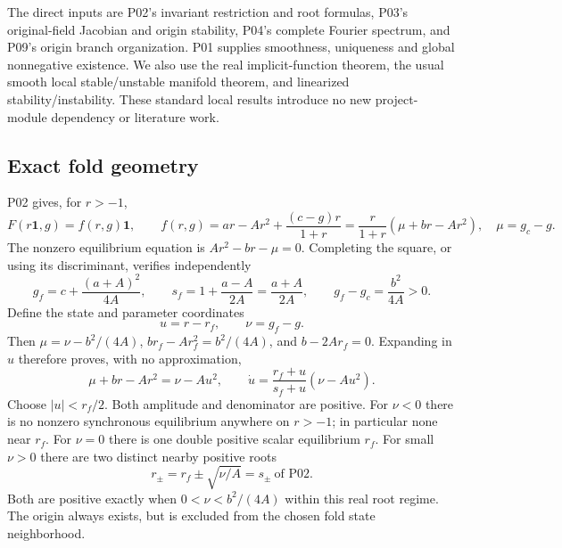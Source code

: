 \documentclass[11pt]{article}
\newcommand{\one}{\mathbf{1}}
\theoremstyle{definition}
\theoremstyle{remark}
\begin{document}
The direct inputs are P02's invariant restriction and root formulas,
P03's original-field Jacobian and origin stability, P04's complete
Fourier spectrum, and P09's origin branch organization. P01 supplies
smoothness, uniqueness and global nonnegative existence. We also use
the real implicit-function theorem, the usual smooth local stable/unstable
manifold theorem, and linearized stability/instability. These standard
local results introduce no new project-module dependency or literature work.

\subsection{Exact fold geometry}
\label{slot:P10-1}

P02 gives, for $r>-1$,
\begin{equation}
 F(r\one,g)=f(r,g)\one,\qquad
 f(r,g)=ar-Ar^2+\frac{(c-g)r}{1+r}
       =\frac r{1+r}(\mu+br-Ar^2),\quad \mu=g_c-g.
 \label{eq:P10-scalar}
\end{equation}
The nonzero equilibrium equation is $Ar^2-br-\mu=0$.
Completing the square, or using its discriminant, verifies independently
\begin{equation}
 g_f=c+\frac{(a+A)^2}{4A},\qquad
 s_f=1+\frac{a-A}{2A}=\frac{a+A}{2A},\qquad
 g_f-g_c=\frac{b^2}{4A}>0.
 \label{eq:P10-fold-identities}
\end{equation}
Define the state and parameter coordinates
\begin{equation}
 u=r-r_f,\qquad \nu=g_f-g.
 \label{eq:P10-coordinates}
\end{equation}
Then $\mu=\nu-b^2/(4A)$, $br_f-Ar_f^2=b^2/(4A)$, and
$b-2Ar_f=0$. Expanding in $u$ therefore proves, with no approximation,
\begin{equation}
 \boxed{\mu+br-Ar^2=\nu-Au^2,\qquad
 \dot u=\frac{r_f+u}{s_f+u}(\nu-Au^2).}
 \label{eq:P10-exact-fold}
\end{equation}
Choose $|u|<r_f/2$. Both amplitude and denominator are positive.
For $\nu<0$ there is no nonzero synchronous equilibrium anywhere on
$r>-1$; in particular none near $r_f$. For $\nu=0$ there is one
double positive scalar equilibrium $r_f$. For small $\nu>0$ there
are two distinct nearby positive roots
\begin{equation}
 \boxed{r_\pm=r_f\pm\sqrt{\nu/A}=s_\pm\ \text{of P02}.}
 \label{eq:P10-local-roots}
\end{equation}
Both are positive exactly when $0<\nu<b^2/(4A)$ within this real
root regime. The origin always exists, but is excluded from the
chosen fold state neighborhood.
\end{document}
